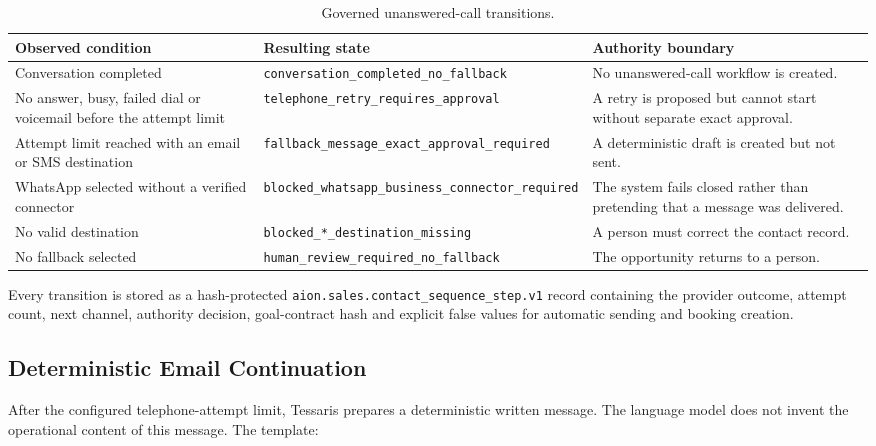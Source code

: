 \begin{table}[htbp]
\centering
\begin{tabularx}{\textwidth}{>{\raggedright\arraybackslash}p{}
                              >{\raggedright\arraybackslash}p{}
                              >{\raggedright\arraybackslash}X}
\toprule
\textbf{Observed condition} & \textbf{Resulting state} & \textbf{Authority boundary} \\
\midrule
Conversation completed & \texttt{conversation\_completed\_no\_fallback} & No unanswered-call workflow is created. \\
No answer, busy, failed dial or voicemail before the attempt limit & \texttt{telephone\_retry\_requires\_approval} & A retry is proposed but cannot start without separate exact approval. \\
Attempt limit reached with an email or SMS destination & \texttt{fallback\_message\_exact\_approval\_required} & A deterministic draft is created but not sent. \\
WhatsApp selected without a verified connector & \texttt{blocked\_whatsapp\_business\_connector\_required} & The system fails closed rather than pretending that a message was delivered. \\
No valid destination & \texttt{blocked\_*\_destination\_missing} & A person must correct the contact record. \\
No fallback selected & \texttt{human\_review\_required\_no\_fallback} & The opportunity returns to a person. \\
\bottomrule
\end{tabularx}
\caption{Governed unanswered-call transitions.}
\label{tab:contact-sequence-states}
\end{table}

Every transition is stored as a hash-protected
\texttt{aion.sales.contact\_sequence\_step.v1} record containing the provider
outcome, attempt count, next channel, authority decision, goal-contract hash and
explicit false values for automatic sending and booking creation.

\subsection{Deterministic Email Continuation}

After the configured telephone-attempt limit, Tessaris prepares a deterministic
written message.  The language model does not invent the operational content of
this message.  The template:

